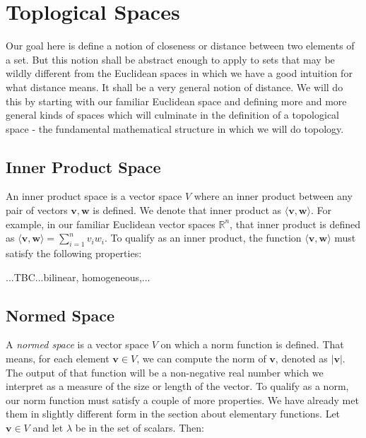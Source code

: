 \section{Toplogical Spaces}
Our goal here is define a notion of closeness or distance between two elements of a set. But this notion shall be abstract enough to apply to sets that may be wildly different from the Euclidean spaces in which we have a good intuition for what distance means. It shall be a very general notion of distance. We will do this by starting with our familiar Euclidean space and defining more and more general kinds of spaces which will culminate in the definition of a topological space - the fundamental mathematical structure in which we will do topology.

\subsection{Inner Product Space}
An inner product space is a vector space $V$ where an inner product between any pair of vectors $\mathbf{v,w}$ is defined. We denote that inner product as $\langle \mathbf{v,w} \rangle$. For example, in our familiar Euclidean vector spaces $\mathbb{R}^n$, that inner product is defined as $\langle \mathbf{v,w} \rangle = \sum_{i=1}^n v_i w_i$. To qualify as an inner product, the function $\langle \mathbf{v,w} \rangle$ must satisfy the following properties:




...TBC...bilinear, homogeneous,...







\subsection{Normed Space}
A \emph{normed space} is a vector space $V$ on which a norm function is defined. That means, for each element $\mathbf{v} \in V$, we can compute the norm of $\mathbf{v}$, denoted as $|\mathbf{v}|$. The output of that function will be a non-negative real number which we interpret as a measure of the size or length of the vector. To qualify as a norm, our norm function must satisfy a couple of more properties. We have already met them in slightly different form in the section about elementary functions. Let $\mathbf{v} \in V$ and let $\lambda$ be in the set of scalars. Then:

